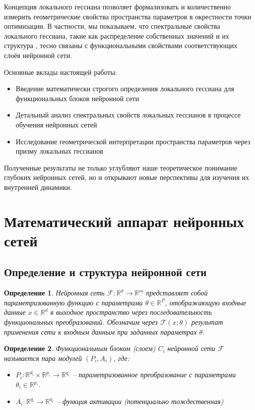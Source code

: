 \documentclass[a4paper,12pt]{article}
\newtheorem{definition}{Определение}
\begin{document}
Концепция локального гессиана позволяет формализовать и количественно измерить геометрические свойства
пространства параметров в окрестности точки оптимизации. В частности, мы показываем, что спектральные
свойства локального гессиана, такие как распределение собственных значений и их структура
\cite{ghorbani2019investigation}, тесно связаны с функциональными свойствами соответствующих слоёв нейронной сети.

Основные вклады настоящей работы:
\begin{itemize}
  \item Введение математически строгого определения локального гессиана для функциональных блоков нейронной сети
  \item Детальный анализ спектральных свойств локальных гессианов в процессе обучения нейронных сетей
  \item Исследование геометрической интерпретации пространства параметров через призму локальных гессианов
\end{itemize}

Полученные результаты не только углубляют наше теоретическое понимание глубоких нейронных сетей, но и
открывают новые перспективы для изучения их внутренней динамики.

\section{Математический аппарат нейронных сетей}

\subsection{Определение и структура нейронной сети}

\begin{definition}
  Нейронная сеть $\mathcal{F}: \mathbb{R}^d \rightarrow \mathbb{R}^m$ представляет собой параметризованную
  функцию с параметрами $\theta \in \mathbb{R}^P$, отображающую входные данные $x \in \mathbb{R}^d$ в
  выходное пространство через последовательность функциональных преобразований. Обозначим через
  $\mathcal{F}(x; \theta)$ результат применения сети к входным данным при заданных параметрах $\theta$.
\end{definition}

\begin{definition}
  Функциональным блоком (слоем) $C_i$ нейронной сети $\mathcal{F}$ называется пара модулей $(P_i, A_i)$, где:
  \begin{itemize}
    \item $P_i: \mathbb{R}^{d_i} \times \mathbb{R}^{p_i} \rightarrow \mathbb{R}^{q_i}$ -- параметризованное
      преобразование с параметрами $\theta_i \in \mathbb{R}^{p_i}$.
    \item $A_i: \mathbb{R}^{q_i} \rightarrow \mathbb{R}^{q_i}$ -- функция активации (потенциально тождественная)
  \end{itemize}
\end{definition}
\end{document}
